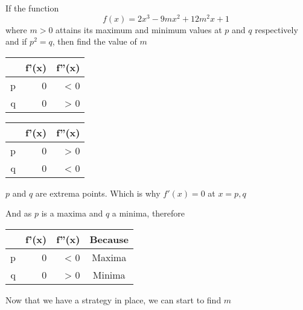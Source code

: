 \documentclass[14pt,fleqn]{extarticle}
\newcommand\fx{2x^3 - 9mx^2 + 12m^2 x + 1}
\begin{document}
\begin{problem}
	\statement 
    
    If the function 
    \[ \qquad f(x) = \fx \]
    where $m > 0$ attains its maximum and minimum values at $p$ and $q$ respectively and if $p^2 = q$, then find the value of $m$ 
    
    \begin{step}
  \begin{options} 
     \correct 
       
       \begin{center}
  \begin{tabular}{NNN}
   \toprule
         &  f'(x) & f''(x) \\
   \midrule 
   p & 0 & < 0 \\
    \midrule 
    q & 0 & > 0 \\
    \bottomrule
  \end{tabular}
\end{center}
     \incorrect
        
               \begin{center}
  \begin{tabular}{NNN}
   \toprule
         &  f'(x) & f''(x) \\
   \midrule 
   p & 0 & > 0 \\
    \midrule 
    q & 0 & < 0 \\
    \bottomrule
  \end{tabular}
\end{center}
    \end{options} 
     \reason 
       
     $p$ and $q$ are extrema points. Which is why $f'(x) = 0$ at $x = p,q$ \newline 
     
     And as $p$ is a maxima and $q$ a minima, therefore 
            \begin{center}
  \begin{tabular}{NNNc}
   \toprule
         &  f'(x) & f''(x) & Because \\
   \midrule 
   p & 0 & < 0 & Maxima \\
    \midrule 
    q & 0 & > 0 & Minima \\
    \bottomrule
  \end{tabular}
\end{center}  

Now that we have a strategy in place, we can start to find $m$ 
\end{step}  


\end{problem}
\end{document}
